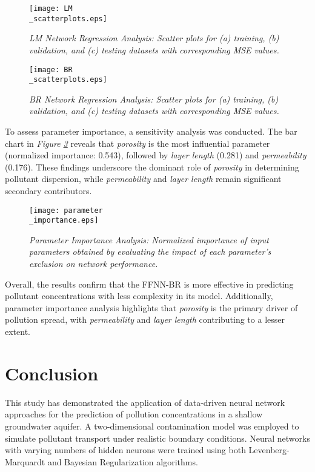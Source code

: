 \documentclass[10pt]{article}
\begin{document}
	\begin{figure}[H]
		\centering
		\texttt{[image: LM\\\_scatterplots.eps]}
		\caption{\textit{LM Network Regression Analysis: Scatter plots for (a) training, (b) validation, and (c) testing datasets with corresponding MSE values.}}
		\label{fig:lm_sct}
	\end{figure}
	
	\begin{figure}[H]
		\centering
		\texttt{[image: BR\\\_scatterplots.eps]}
		\caption{\textit{BR Network Regression Analysis: Scatter plots for (a) training, (b) validation, and (c) testing datasets with corresponding MSE values.}}
		\label{fig:br_sct}
	\end{figure}
	
	To assess parameter importance, a sensitivity analysis was conducted. The bar chart in \textit{Figure \ref{fig:param_imp}} reveals that \textit{porosity} is the most influential parameter (normalized importance: 0.543), followed by \textit{layer length} (0.281) and \textit{permeability} (0.176). These findings underscore the dominant role of \textit{porosity} in determining pollutant dispersion, while \textit{permeability} and \textit{layer length} remain significant secondary contributors.
	
	\begin{figure}[H]
		\centering
		\texttt{[image: parameter\\\_importance.eps]}
		\caption{\textit{Parameter Importance Analysis: Normalized importance of input parameters obtained by evaluating the impact of each parameter's exclusion on network performance.}}
		\label{fig:param_imp}
	\end{figure}
	
	Overall, the results confirm that the FFNN-BR is more effective in predicting pollutant concentrations with less complexity in its model. Additionally, parameter importance analysis highlights that \textit{porosity} is the primary driver of pollution spread, with \textit{permeability} and \textit{layer length} contributing to a lesser extent.
	
	\section{Conclusion}
	This study has demonstrated the application of data-driven neural network approaches for the prediction of pollution concentrations in a shallow groundwater aquifer. A two-dimensional contamination model was employed to simulate pollutant transport under realistic boundary conditions. Neural networks with varying numbers of hidden neurons were trained using both Levenberg-Marquardt and Bayesian Regularization algorithms.
	
\end{document}
